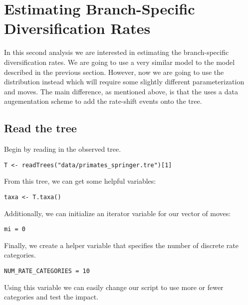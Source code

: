 







\bigskip
\section{Estimating Branch-Specific Diversification Rates}

In this second analysis we are interested in estimating the branch-specific diversification rates.
We are going to use a very similar model to the model described in the previous section.
However, now we are going to use the  distribution instead which will require some slightly different parameterization and moves.
The main difference, as mentioned above, is that the  uses a data augementation scheme to add the rate-shift events onto the tree.

\subsection{Read the tree}

Begin by reading in the observed tree. 

{\tt \begin{snugshade*}
\begin{lstlisting}
T <- readTrees("data/primates_springer.tre")[1]
\end{lstlisting}
\end{snugshade*}}

From this tree, we can get some helpful variables:
{\tt \begin{snugshade*}
\begin{lstlisting}
taxa <- T.taxa()
\end{lstlisting}
\end{snugshade*}}

Additionally, we can initialize an iterator variable for our vector of moves:
{\tt \begin{snugshade*}
\begin{lstlisting}
mi = 0
\end{lstlisting}
\end{snugshade*}}

Finally, we create a helper variable that specifies the number of discrete rate categories.
{\tt \begin{snugshade*}
\begin{lstlisting}
NUM_RATE_CATEGORIES = 10
\end{lstlisting}
\end{snugshade*}}
Using this variable we can easily change our script to use more or fewer categories and test the impact.



